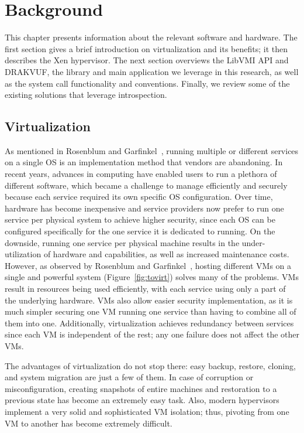 \chapter{Background}\label{ch:background}

This chapter presents information about the relevant software and hardware. The first section gives a brief introduction on virtualization and its benefits; it then describes the Xen hypervisor. The next section overviews the LibVMI \ac{API} and DRAKVUF, the library and main application we leverage in this research, as well as the system call functionality and conventions. Finally, we review some of the existing solutions that leverage introspection.

\section{Virtualization}\label{sec:virtualization}
As mentioned in Rosenblum and Garfinkel~\cite{rosenblum2005virtual}, running multiple or different services on a single \ac{OS} is an implementation method that vendors are abandoning. In recent years, advances in computing have enabled users to run a plethora of different software, which became a challenge to manage efficiently and securely because each service required its own specific \ac{OS} configuration. Over time, hardware has become inexpensive and service providers now prefer to run one service per physical system to achieve higher security, since each \ac{OS} can be configured specifically for the one service it is dedicated to running. On the downside, running one service per physical machine results in the under-utilization of hardware and capabilities, as well as increased maintenance costs. However, as observed by Rosenblum and Garfinkel~\cite{rosenblum2005virtual}, hosting different \ac{VM}s on a single and powerful system (Figure~\ref{fig:tovirt}) solves many of the problems. \ac{VM}s result in resources being used efficiently, with each service using only a part of the underlying hardware. \acp{VM} also allow easier security implementation, as it is much simpler securing one \ac{VM} running one service than having to combine all of them into one. Additionally, virtualization achieves redundancy between services since each \ac{VM} is independent of the rest; any one failure does not affect the other \ac{VM}s.

\par The advantages of virtualization do not stop there: easy backup, restore, cloning, and system migration are just a few of them. In case of corruption or misconfiguration, creating snapshots of entire machines and restoration to a previous state has become an extremely easy task. Also, modern hypervisors implement a very solid and sophisticated \ac{VM} isolation; thus, pivoting from one \ac{VM} to another has become extremely difficult.

